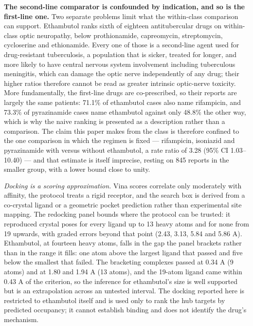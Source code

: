 \documentclass[utf8]{FrontiersinVancouver}
\begin{document}
\textbf{The second-line comparator is confounded by indication, and so is the first-line one.} Two separate problems limit what the within-class comparison can support. Ethambutol ranks sixth of eighteen antitubercular drugs on within-class optic neuropathy, below prothionamide, capreomycin, streptomycin, cycloserine and ethionamide. Every one of those is a second-line agent used for drug-resistant tuberculosis, a population that is sicker, treated for longer, and more likely to have central nervous system involvement including tuberculous meningitis, which can damage the optic nerve independently of any drug; their higher ratios therefore cannot be read as greater intrinsic optic-nerve toxicity. More fundamentally, the first-line drugs are co-prescribed, so their reports are largely the same patients: 71.1\% of ethambutol cases also name rifampicin, and 73.3\% of pyrazinamide cases name ethambutol against only 48.8\% the other way, which is why the naive ranking is presented as a description rather than a comparison. The claim this paper makes from the class is therefore confined to the one comparison in which the regimen is fixed --- rifampicin, isoniazid and pyrazinamide with versus without ethambutol, a rate ratio of 3.28 (95\% CI 1.03--10.40) --- and that estimate is itself imprecise, resting on 845 reports in the smaller group, with a lower bound close to unity.

\textit{Docking is a scoring approximation.} Vina scores correlate only moderately with affinity, the protocol treats a rigid receptor, and the search box is derived from a co-crystal ligand or a geometric pocket prediction rather than experimental site mapping. The redocking panel bounds where the protocol can be trusted: it reproduced crystal poses for every ligand up to 13 heavy atoms and for none from 19 upwards, with graded errors beyond that point (2.43, 3.13, 5.84 and 5.86 A). Ethambutol, at fourteen heavy atoms, falls in the gap the panel brackets rather than in the range it fills: one atom above the largest ligand that passed and five below the smallest that failed. The bracketing complexes passed at 0.34 A (9 atoms) and at 1.80 and 1.94 A (13 atoms), and the 19-atom ligand came within 0.43 A of the criterion, so the inference for ethambutol's size is well supported but is an extrapolation across an untested interval. The docking reported here is restricted to ethambutol itself and is used only to rank the hub targets by predicted occupancy; it cannot establish binding and does not identify the drug's mechanism.
\end{document}
